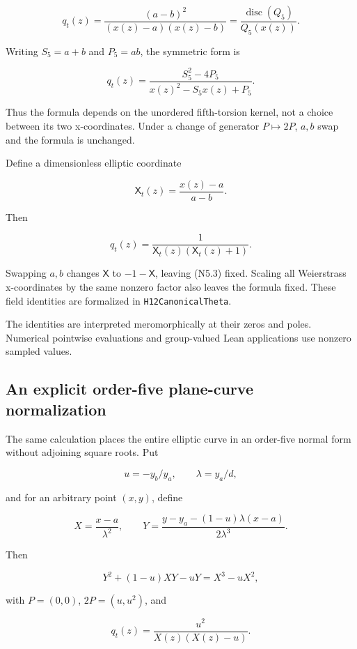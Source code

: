\[
 \boxed{
 q_t(z)=\frac{(a-b)^2}{(x(z)-a)(x(z)-b)}
       =\frac{\operatorname{disc}(Q_5)}{Q_5(x(z))}.
 }                                                       \tag{N5.1}
\]

Writing \(S_5=a+b\) and \(P_5=ab\), the symmetric form is

\[
 q_t(z)=\frac{S_5^2-4P_5}{x(z)^2-S_5x(z)+P_5}.            \tag{N5.2}
\]

Thus the formula depends on the unordered fifth-torsion kernel, not a
choice between its two x-coordinates. Under a change of generator
\(P\mapsto2P\), \(a,b\) swap and the formula is unchanged.

Define a dimensionless elliptic coordinate

\[
 \mathsf X_t(z)=\frac{x(z)-a}{a-b}.
\]

Then

\[
 \boxed{q_t(z)=\frac1{\mathsf X_t(z)(\mathsf X_t(z)+1)}.}   \tag{N5.3}
\]

Swapping \(a,b\) changes \(\mathsf X\) to \(-1-\mathsf X\), leaving
(N5.3) fixed. Scaling all Weierstrass x-coordinates by the same nonzero
factor also leaves the formula fixed. These field identities are
formalized in \texttt{H12CanonicalTheta}.

The identities are interpreted meromorphically at their zeros and poles.
Numerical pointwise evaluations and group-valued Lean applications use
nonzero sampled values.

\hypertarget{N-an-explicit-order-five-plane-curve-normalization}{%
\subsection{An explicit order-five plane-curve
normalization}\label{N-an-explicit-order-five-plane-curve-normalization}}

The same calculation places the entire elliptic curve in an order-five
normal form without adjoining square roots. Put

\[
 u=-y_b/y_a,\qquad \lambda=y_a/d,
\]

and for an arbitrary point \((x,y)\), define

\[
 X=\frac{x-a}{\lambda^2},\qquad
 Y=\frac{y-y_a-(1-u)\lambda(x-a)}{2\lambda^3}.
\]

Then

\[
 \boxed{Y^2+(1-u)XY-uY=X^3-uX^2,}                        \tag{N6.1}
\]

with \(P=(0,0)\), \(2P=(u,u^2)\), and

\[
 \boxed{q_t(z)=\frac{u^2}{X(z)(X(z)-u)}.}                  \tag{N6.2}
\]

